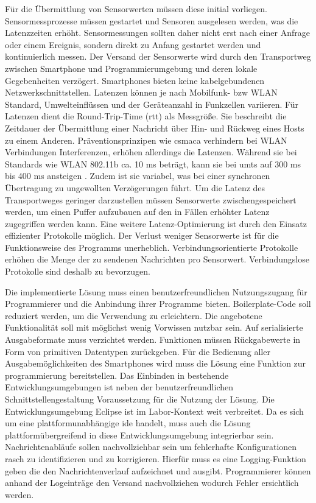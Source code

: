 \documentclass[11pt,a4paper]{report}
\begin{document}
Für die Übermittlung von Sensorwerten müssen diese initial vorliegen.
Sensormessprozesse müssen gestartet und Sensoren ausgelesen werden, was die Latenzzeiten erhöht.
Sensormessungen sollten daher nicht erst nach einer Anfrage oder einem Ereignis, sondern direkt zu Anfang gestartet werden und kontinuierlich messen.
Der Versand der Sensorwerte wird durch den Transportweg zwischen Smartphone und Programmierumgebung und deren lokale Gegebenheiten verzögert.
Smartphones bieten keine kabelgebundenen Netzwerkschnittstellen.
Latenzen können je nach Mobilfunk- bzw WLAN Standard, Umwelteinflüssen und der Geräteanzahl in Funkzellen variieren.
Für Latenzen dient die Round-Trip-Time (\acrshort{rtt}) als Messgröße.
Sie beschreibt die Zeitdauer der Übermittlung einer Nachricht über Hin- und Rückweg eines Hosts zu einem Anderen.
Präventionsprinzipen wie \acrshort{csmaca} verhindern bei WLAN Verbindungen Interferenzen, erhöhen allerdings die Latenzen.
Während sie bei Standards wie WLAN 802.11b ca. 10 ms beträgt, kann sie bei \acrshort{umts} auf 300 ms bis 400 ms ansteigen \cite{network_latencies} .
Zudem ist sie variabel, was bei einer synchronen Übertragung zu ungewollten Verzögerungen führt.
Um die Latenz des Transportweges geringer darzustellen müssen Sensorwerte zwischengespeichert werden, um einen Puffer aufzubauen auf den in Fällen erhöhter Latenz zugegriffen werden kann.
Eine weitere Latenz-Optimierung ist durch den Einsatz effizienter Protokolle möglich.
Der Verlust weniger Sensorwerte ist für die Funktionsweise des Programms unerheblich.
Verbindungsorientierte Protokolle erhöhen die Menge der zu sendenen Nachrichten pro Sensorwert.
Verbindungslose Protokolle sind deshalb zu bevorzugen.

Die implementierte Lösung muss einen benutzerfreundlichen Nutzungszugang  für Programmierer und die Anbindung ihrer Programme bieten.
Boilerplate-Code soll reduziert werden, um die Verwendung zu erleichtern.
Die angebotene Funktionalität soll mit möglichst wenig Vorwissen nutzbar sein.
Auf serialisierte Ausgabeformate muss verzichtet werden.
Funktionen müssen Rückgabewerte in Form von primitiven Datentypen zurückgeben.
Für die Bedienung aller Ausgabemöglichkeiten des Smartphones wird muss die Lösung eine Funktion zur programmierung bereitstellen.
Das Einbinden in bestehende Entwicklungsumgebungen ist neben der benutzerfreundlichen Schnittstellengestaltung Voraussetzung für die Nutzung der Lösung.
Die Entwicklungsumgebung Eclipse ist im Labor-Kontext weit verbreitet.
Da es sich um eine plattformunabhängige \acrshort{ide} handelt, muss auch die Lösung plattformübergreifend in diese Entwicklungsumgebung integrierbar sein.
Nachrichtenabläufe sollen nachvollziehbar sein um fehlerhafte Konfigurationen rasch zu identifizieren und zu korrigieren.
Hierfür muss es eine Logging-Funktion geben die den Nachrichtenverlauf aufzeichnet und ausgibt.
Programmierer können anhand der Logeinträge den Versand nachvollziehen wodurch Fehler ersichtlich werden.
\end{document}
